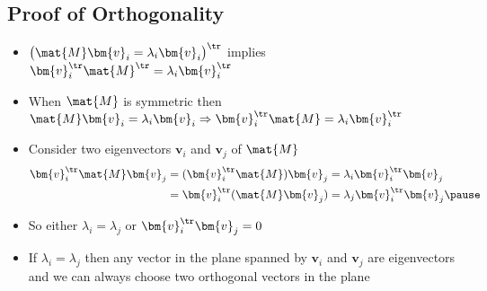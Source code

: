 \begin{slide}
\section[-2]{Proof of Orthogonality}

\begin{PauseHighLight}
  \begin{itemize}
  \item $\left(\strut \mat{M}\bm{v}_i = \lambda_i\bm{v}_i\right)^\tr$
    implies $\bm{v}_i^\tr \mat{M}^\tr = \lambda_i\bm{v}_i^\tr$\pause
  \item When $\mat{M}$ is symmetric then $\mat{M}\bm{v}_i = \lambda_i\bm{v}_i
    \Rightarrow \bm{v}_i^\tr \mat{M} = \lambda_i\bm{v}_i^\tr$\pause
  \item Consider two eigenvectors $\bm{v}_i$ and $\bm{v}_j$ of $\mat{M}$
    \begin{align*}
      \bm{v}_i^\tr \mat{M} \bm{v}_j &= (\bm{v}_i^\tr \mat{M}) \bm{v}_j =
      \lambda_i  \bm{v}_i^\tr \bm{v}_j \\
      &= \bm{v}_i^\tr (\mat{M} \bm{v}_j)
      = \lambda_j  \bm{v}_i^\tr \bm{v}_j\pause
    \end{align*}
  \item So either $\lambda_i = \lambda_j$ or $\bm{v}_i^\tr \bm{v}_j=0$\pause
  \item If $\lambda_i = \lambda_j$ then any vector in the plane spanned
    by $\bm{v}_i$ and $\bm{v}_j$ are eigenvectors and we can always
    choose two orthogonal vectors in the plane\pause
  \end{itemize}
\end{PauseHighLight}

\end{slide}



